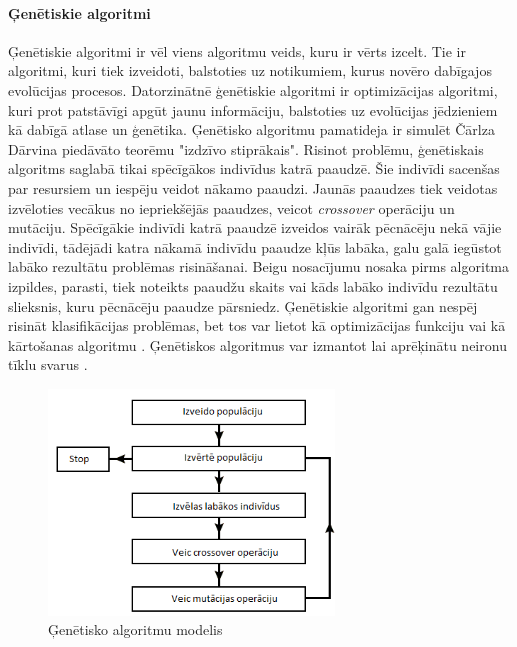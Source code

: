 \paragraph{Ģenētiskie algoritmi}
\hfill\par
Ģenētiskie algoritmi ir vēl viens algoritmu veids, kuru ir vērts izcelt. Tie ir algoritmi, kuri tiek izveidoti, balstoties uz notikumiem, kurus novēro dabīgajos evolūcijas procesos. Datorzinātnē ģenētiskie algoritmi ir optimizācijas algoritmi, kuri prot patstāvīgi apgūt jaunu informāciju, balstoties uz evolūcijas jēdzieniem kā dabīgā atlase un ģenētika. Ģenētisko algoritmu pamatideja ir simulēt Čārlza Dārvina piedāvāto teorēmu "izdzīvo stiprākais". Risinot problēmu, ģenētiskais algoritms saglabā tikai spēcīgākos indivīdus katrā paaudzē. Šie indivīdi sacenšas par resursiem un iespēju veidot nākamo paaudzi. Jaunās paaudzes tiek veidotas izvēloties vecākus no iepriekšējās paaudzes, veicot \textit{crossover} operāciju un mutāciju. Spēcīgākie indivīdi katrā paaudzē izveidos vairāk pēcnācēju nekā vājie indivīdi, tādējādi katra nākamā indivīdu paaudze kļūs labāka, galu galā iegūstot labāko rezultātu problēmas risināšanai. Beigu nosacījumu nosaka pirms algoritma izpildes, parasti, tiek noteikts paaudžu skaits vai kāds labāko indivīdu rezultātu slieksnis, kuru pēcnācēju paaudze pārsniedz. Ģenētiskie algoritmi gan nespēj risināt klasifikācijas problēmas, bet tos var lietot kā optimizācijas funkciju \cite{genopti} vai kā kārtošanas algoritmu \cite{deb2000fast}. Ģenētiskos algoritmus var izmantot lai aprēķinātu neironu tīklu svarus \cite{genalg}.
\begin{figure}[h]%
	\centering
	\includegraphics[height=6cm]{images/gen-algo-bilde.png} %
	\caption{Ģenētisko algoritmu modelis}%
	\label{fig:example}%
\end{figure}
